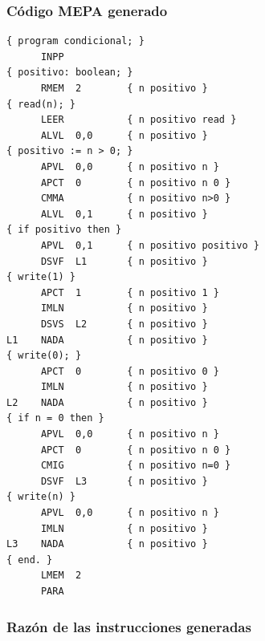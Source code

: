 \documentclass[12pt]{article}
\begin{document}
\subsubsection*{Código MEPA generado}
\begin{lstlisting}[frame=single, basicstyle=\ttfamily\small, breaklines=true]
{ program condicional; }
      INPP
{ positivo: boolean; }
      RMEM  2        { n positivo }
{ read(n); }
      LEER           { n positivo read }
      ALVL  0,0      { n positivo }
{ positivo := n > 0; }
      APVL  0,0      { n positivo n }
      APCT  0        { n positivo n 0 }
      CMMA           { n positivo n>0 }
      ALVL  0,1      { n positivo }
{ if positivo then }
      APVL  0,1      { n positivo positivo }
      DSVF  L1       { n positivo }
{ write(1) }
      APCT  1        { n positivo 1 }
      IMLN           { n positivo }
      DSVS  L2       { n positivo }
L1    NADA           { n positivo }
{ write(0); }
      APCT  0        { n positivo 0 }
      IMLN           { n positivo }
L2    NADA           { n positivo }
{ if n = 0 then }
      APVL  0,0      { n positivo n }
      APCT  0        { n positivo n 0 }
      CMIG           { n positivo n=0 }
      DSVF  L3       { n positivo }
{ write(n) }
      APVL  0,0      { n positivo n }
      IMLN           { n positivo }
L3    NADA           { n positivo }
{ end. }
      LMEM  2
      PARA
\end{lstlisting}

\subsubsection*{Razón de las instrucciones generadas}
\end{document}
